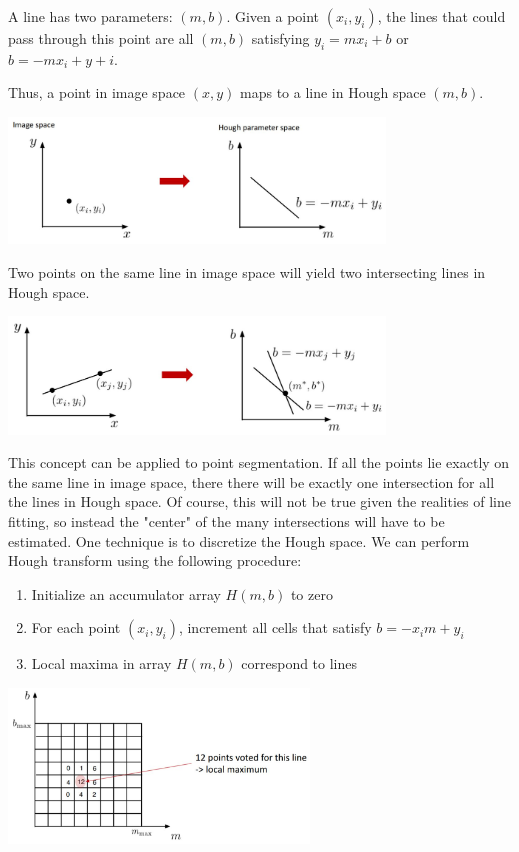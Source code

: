 \documentclass[twoside]{article}
\begin{document}
A line has two parameters: $(m,b)$. Given a point $(x_i,y_i)$, the lines that could pass through this point are all $(m,b)$ satisfying $y_i=mx_i+b$ or $b=-mx_i+y+i$.

Thus, a point in image space $(x,y)$ maps to a line in Hough space $(m,b)$.

\begin{center}
	\includegraphics[width=0.75\textwidth]{hough1}
\end{center}

Two points on the same line in image space will yield two intersecting lines in Hough space.

\begin{center}
	\includegraphics[width=0.75\textwidth]{hough2}
\end{center}

This concept can be applied to point segmentation. If all the points lie exactly on the same line in image space, there there will be exactly one intersection for all the lines in Hough space. Of course, this will not be true given the realities of line fitting, so instead the "center" of the many intersections will have to be estimated. One technique is to discretize the Hough space. We can perform Hough transform using the following procedure:

\begin{enumerate}
\item Initialize an accumulator array $H(m,b)$ to zero
\item For each point $(x_i, y_i)$, increment all cells that satisfy $b = -x_i m + y_i$
\item Local maxima in array $H(m,b)$ correspond to lines
\end{enumerate}

\begin{center}
	\includegraphics[width=0.6\textwidth]{hough3}
\end{center}
\end{document}

